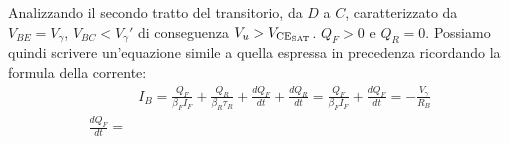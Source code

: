 \documentclass[../template]{subfiles}
\begin{document}
Analizzando il secondo tratto del transitorio, da $D$ a $C$, caratterizzato da $V_{BE} = V_\gamma$, $V_{BC} < V_\gamma'$ di conseguenza $V_u > V_{\text{CE}_{\text{SAT}}}$. $Q_F > 0$ e $Q_R = 0$. Possiamo quindi scrivere un'equazione simile a quella espressa in precedenza ricordando la formula della corrente:
\begin{align*}
    &I_B  = \frac{Q_F}{\beta_F I_F} + \frac{Q_R}{\beta_R \tau_R} + \frac{dQ_F}{dt} + \frac{dQ_R}{dt}
          =  \frac{Q_F}{\beta_F I_F} + \frac{dQ_F}{dt}  = -\frac{V_\gamma}{R_B}
    \\
    \frac{dQ_F}{dt} =
\end{align*}
\end{document}
